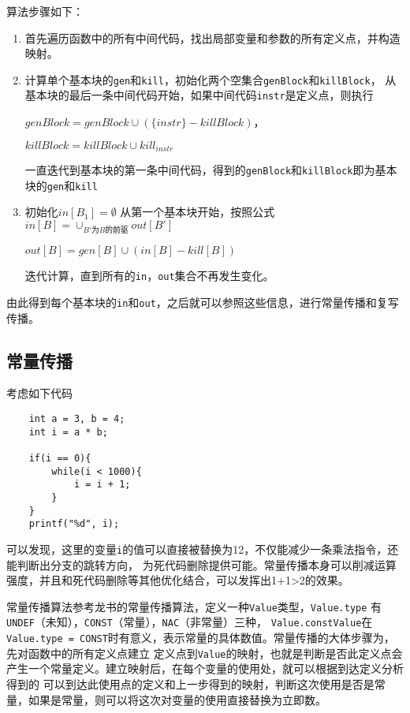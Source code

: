 算法步骤如下：
\begin{enumerate}
    \item 首先遍历函数中的所有中间代码，找出局部变量和参数的所有定义点，并构造映射。
    \item 计算单个基本块的\texttt{gen}和\texttt{kill}，初始化两个空集合\texttt{genBlock}和\texttt{killBlock}，
    从基本块的最后一条中间代码开始，如果中间代码\texttt{instr}是定义点，则执行

    $genBlock = genBlock \cup (\{instr\} - killBlock)$，

    $killBlock = killBlock \cup kill_{instr}$

    一直迭代到基本块的第一条中间代码，得到的\texttt{genBlock}和\texttt{killBlock}即为基本块的\texttt{gen}和\texttt{kill}

    \item 初始化$in[B_1] = \emptyset$ 从第一个基本块开始，按照公式
    $\displaystyle  in[B] =\cup_{B'为B的前驱} out[B'] $

    $out[B] = gen[B] \cup (in[B] - kill[B])$

    迭代计算，直到所有的\texttt{in}，\texttt{out}集合不再发生变化。

\end{enumerate}

由此得到每个基本块的\texttt{in}和\texttt{out}，之后就可以参照这些信息，进行常量传播和复写传播。

\subsection{常量传播}

考虑如下代码
\begin{verbatim}
    int a = 3, b = 4;
    int i = a * b;

    if(i == 0){
        while(i < 1000){
            i = i + 1;
        }
    }
    printf("%d", i);
\end{verbatim}

可以发现，这里的变量\texttt{i}的值可以直接被替换为12，不仅能减少一条乘法指令，还能判断出分支的跳转方向，
为死代码删除提供可能。常量传播本身可以削减运算强度，并且和死代码删除等其他优化结合，可以发挥出1+1>2的效果。

常量传播算法参考龙书的常量传播算法，定义一种\texttt{Value}类型，\texttt{Value.type} 有\texttt{UNDEF}（未知），\texttt{CONST}（常量），\texttt{NAC}（非常量）三种，
\texttt{Value.constValue}在\texttt{Value.type = CONST}时有意义，表示常量的具体数值。常量传播的大体步骤为，先对函数中的所有定义点建立
定义点到\texttt{Value}的映射，也就是判断是否此定义点会产生一个常量定义。建立映射后，在每个变量的使用处，就可以根据到达定义分析得到的
可以到达此使用点的定义和上一步得到的映射，判断这次使用是否是常量，如果是常量，则可以将这次对变量的使用直接替换为立即数。

